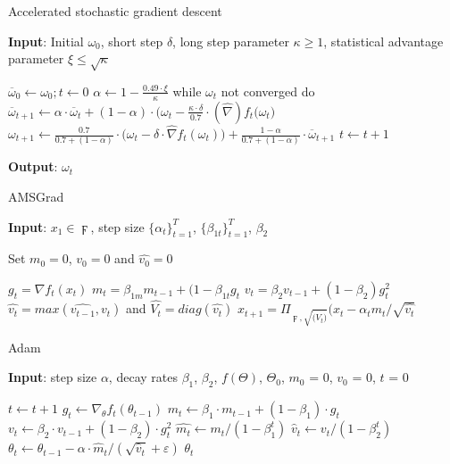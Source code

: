 \documentclass[a4paper,12pt]{article}
\theoremstyle{plain} %
\theoremstyle{definition} %
\theoremstyle{remark} %
\theoremstyle{definition}
\theoremstyle{definition}
\let\leq\leqslant
\let\geq\geqslant
\let\eps\varepsilon
\begin{document}
	
	\begin{algorithm}[h!]
		\caption{Accelerated stochastic gradient descent}
		\hspace*{\algorithmicindent} \textbf{Input}: Initial $\omega_{0}$, short step $\delta$, long step parameter $\kappa\geq 1$, statistical advantage parameter $\xi\leq \sqrt{\kappa}$
		\begin{algorithmic}[3]
			\STATE $\overline{\omega}_{0}\longleftarrow\omega_{0}; t\longleftarrow0$
			\STATE $\alpha\longleftarrow 1-\frac{0.49\cdot \xi}{\kappa}$
			\STATE while $\omega_{t}$ not converged do
			\STATE $\overline{\omega}_{t+1}\longleftarrow \alpha\cdot\overline{\omega}_{t}+(1-\alpha)\cdot \big(\omega_{t}-\frac{\kappa\cdot\delta}{0.7}\cdot(\hat{\nabla})f_{t}(\omega_{t}\big)$
			\STATE $\omega_{t+1}\longleftarrow\frac{0.7}{0.7+(1-\alpha)}\cdot\big(\omega_{t}-\delta\cdot\hat{\nabla}f_{t}(\omega_{t})\big)+\frac{1-\alpha}{0.7+(1-\alpha)}\cdot \overline{\omega}_{t+1}$
			\STATE $t\longleftarrow t+1$
		\end{algorithmic}
		\textbf{Output}: $\omega_{t}$
	\end{algorithm}
	
	\begin{algorithm}[h!]
		\caption{AMSGrad}
		\hspace*{\algorithmicindent} \textbf{Input}: $x_1 \in \digamma$, step size $\{\alpha_t\}^T_{t=1}$, $\{\beta_{1t}\}^T_{t=1}$, $\beta_2$
		
		Set $m_0 = 0$, $v_0 = 0$ and $\hat{v_0} = 0$ 
		\label{RKalg}
		\begin{algorithmic}[2] 
			\STATE $g_t = \nabla{f_t(x_t)}$
			\STATE $m_t = \beta_{1m}m_{t-1} + (1-\beta_{1t}g_t$
			\STATE $v_t = \beta_2v_{t-1} + (1-\beta_2)g_t^2$
			\STATE $\hat{v_t} = max(\hat{v_{t-1}}, v_t)$ and $\hat{V_t} = diag(\hat{v_t})$
			\STATE $x_{t+1} = \Pi_{\digamma, \sqrt{\hat(V_t)} }(x_t - \alpha_t m_t/ \sqrt{\hat{v_t}}$
			\ENDFOR
		\end{algorithmic}
	\end{algorithm}
	
	\begin{algorithm}[h!]
		\caption{Adam}
		\textbf{Input}: step size $\alpha$, decay rates $\beta_1$, $\beta_2$, $f(\Theta)$, $\Theta_0$, $m_0$ = 0, $v_0$ = 0, $t$ = 0
		\begin{algorithmic}
			\STATE $t\longleftarrow t+1$
			\STATE $g_{t}\longleftarrow\nabla_{\theta}f_{t}(\theta_{t-1})$ 
			\STATE $m_{t}\longleftarrow\beta_{1}\cdot m_{t-1}+(1-\beta_{1})\cdot g_{t}$
			\STATE $v_{t}\longleftarrow\beta_{2}\cdot v_{t-1}+(1-\beta_{2})\cdot g_{t}^{2}$
			\STATE $\hat{m_{t}}\longleftarrow m_{t}/(1-\beta_{1}^{t})$
			\STATE $\hat{v}_{t}\longleftarrow v_{t}/(1-\beta_{2}^{t})$
			\STATE $\theta_{t}\longleftarrow\theta_{t-1}-\alpha\cdot\hat{m}_{t}/(\sqrt{\hat{v}_{t}}+\eps)$
			\ENDWHILE
			\RETURN $\theta_{t}$
		\end{algorithmic}
	\end{algorithm}
	
\end{document}
